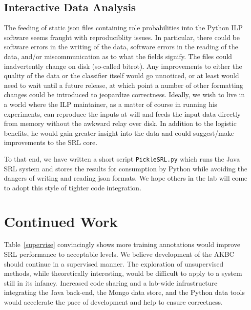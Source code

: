 \documentclass{article} %
\begin{document}
\subsection{Interactive Data Analysis}
The feeding of static json files containing role probabilities into the Python ILP software seems fraught with reproduciblity issues.  In particular, there could be software errors in the writing of the data, software errors in the reading of the data, and/or miscommunication as to what the fields signify.  The files could inadvertently change on disk (so-called bitrot).  Any improvements to either the quality of the data or the classifier itself would go unnoticed, or at least would need to wait until a future release, at which point a number of other formatting changes could be introduced to jeopardize correctness.  Ideally, we wish to live in a world where the ILP maintainer, as a matter of course in running his experiments, can reproduce the inputs at will and feeds the input data directly from memory without the awkward relay over disk.  In addition to the logistic benefits, he would gain greater insight into the data and could suggest/make improvements to the SRL core.

To that end, we have written a short script {\tt PickleSRL.py} which runs the Java SRL system and stores the results for consumption by Python while avoiding the dangers of writing and reading json formats.  We hope others in the lab will come to adopt this style of tighter code integration.

\section{Continued Work}
Table~\ref{supervise} convincingly shows more training annotations would improve SRL performance to acceptable levels.  We believe development of the AKBC should continue in a supervised manner.  The exploration of unsupervised methods, while theoretically interesting, would be difficult to apply to a system still in its infancy.  Increased code sharing and a lab-wide infrastructure integrating the Java back-end, the Mongo data store, and the Python data tools would accelerate the pace of development and help to ensure correctness.

\small{
\printbibliography
}
\end{document}
